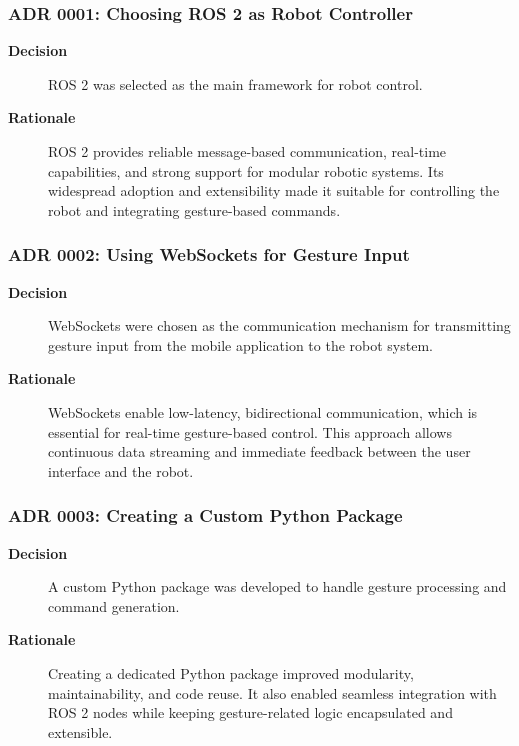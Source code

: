 \documentclass[11pt,a4paper]{article}
\begin{document}
\subsubsection{ADR 0001: Choosing ROS 2 as Robot Controller}

\begin{description}
	\item[\textbf{Decision}] ROS 2 was selected as the main framework for robot control.
	\item[\textbf{Rationale}] ROS 2 provides reliable message-based communication, real-time capabilities, and strong support for modular robotic systems. Its widespread adoption and extensibility made it suitable for controlling the robot and integrating gesture-based commands.
\end{description}

\subsubsection*{ADR 0002: Using WebSockets for Gesture Input}

\begin{description}
	\item[\textbf{Decision}] WebSockets were chosen as the communication mechanism for transmitting gesture input from the mobile application to the robot system.
	\item[\textbf{Rationale}] WebSockets enable low-latency, bidirectional communication, which is essential for real-time gesture-based control. This approach allows continuous data streaming and immediate feedback between the user interface and the robot.
\end{description}

\subsubsection*{ADR 0003: Creating a Custom Python Package}

\begin{description}
	\item[\textbf{Decision}] A custom Python package was developed to handle gesture processing and command generation.
	\item[\textbf{Rationale}] Creating a dedicated Python package improved modularity, maintainability, and code reuse. It also enabled seamless integration with ROS 2 nodes while keeping gesture-related logic encapsulated and extensible.
\end{description}
\end{document}
